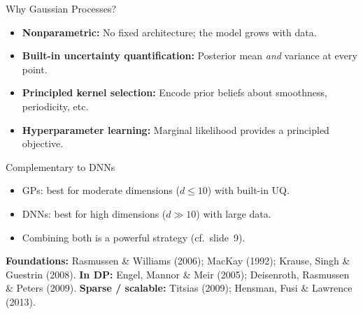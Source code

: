 \documentclass[aspectratio=169,11pt]{beamer}
\begin{document}
\begin{frame}{Why Gaussian Processes?}
\begin{itemize}
  \item \textbf{Nonparametric:} No fixed architecture; the model grows with data.
  \item \textbf{Built-in uncertainty quantification:} Posterior mean \emph{and} variance at every point.
  \item \textbf{Principled kernel selection:} Encode prior beliefs about smoothness, periodicity, etc.
  \item \textbf{Hyperparameter learning:} Marginal likelihood provides a principled objective.
\end{itemize}

\vspace{0.3cm}
\begin{alertblock}{Complementary to DNNs}
\begin{itemize}
  \item GPs: best for moderate dimensions ($d \leq 10$) with built-in UQ.
  \item DNNs: best for high dimensions ($d \gg 10$) with large data.
  \item Combining both is a powerful strategy (cf.\ slide~9).
\end{itemize}
\end{alertblock}

\vspace{0.15cm}
{\tiny \textbf{Foundations:} Rasmussen \& Williams (2006); MacKay (1992); Krause, Singh \& Guestrin (2008).
\textbf{In DP:} Engel, Mannor \& Meir (2005); Deisenroth, Rasmussen \& Peters (2009).
\textbf{Sparse / scalable:} Titsias (2009); Hensman, Fusi \& Lawrence (2013).}
\end{frame}
\end{document}

